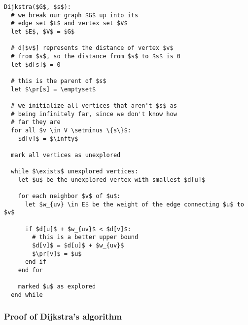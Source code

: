 \documentclass[12pt]{article}
\begin{document}
  \begin{lstlisting}
Dijkstra($G$, $s$):
  # we break our graph $G$ up into its
  # edge set $E$ and vertex set $V$
  let $E$, $V$ = $G$

  # d[$v$] represents the distance of vertex $v$
  # from $s$, so the distance from $s$ to $s$ is 0
  let $d[s]$ = 0

  # this is the parent of $s$
  let $\pr[s] = \emptyset$

  # we initialize all vertices that aren't $s$ as
  # being infinitely far, since we don't know how
  # far they are
  for all $v \in V \setminus \{s\}$:
    $d[v]$ = $\infty$

  mark all vertices as unexplored

  while $\exists$ unexplored vertices:
    let $u$ be the unexplored vertex with smallest $d[u]$

    for each neighbor $v$ of $u$:
      let $w_{uv} \in E$ be the weight of the edge connecting $u$ to $v$

      if $d[u]$ + $w_{uv}$ < $d[v]$:
        # this is a better upper bound
        $d[v]$ = $d[u]$ + $w_{uv}$
        $\pr[v]$ = $u$
      end if
    end for

    marked $u$ as explored
  end while
  \end{lstlisting}

  \subsubsection{Proof of Dijkstra's algorithm}

\end{document}
